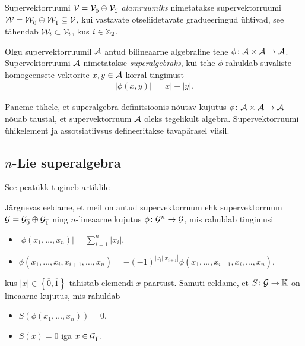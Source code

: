Supervektorruumi $\mathcal{V} = \mathcal{V}_{\overline{0}} \oplus \mathcal{V}_{\overline{1}}$
\emph{alamruumiks} nimetatakse supervektorruumi
$\mathcal{W} = \mathcal{W}_{\overline{0}} \oplus \mathcal{W}_{\overline{1}} \subseteq \mathcal{V}$, kui
vastavate otseliidetavate gradueeringud ühtivad, see tähendab
$\mathcal{W}_i \subset \mathcal{V}_i$, kus $i \in \mathbb{Z}_2$.

\begin{dfn}
    Olgu supervektorruumil $\mathcal{A}$ antud bilineaarne algebraline tehe
    $\phi \colon \mathcal{A} \times \mathcal{A} \to \mathcal{A}$. Supervektorruumi $\mathcal{A}$ nimetatakse
    \emph{superalgebraks}, kui tehe $\phi$ rahuldab suvaliste homogeensete
    vektorite $x, y \in \mathcal{A}$ korral tingimust
    \begin{align}\label{def:superalgebra-parity}
        \left|\phi(x, y)\right| = |x| + |y|.
    \end{align}
\end{dfn}

Paneme tähele, et superalgebra definitsioonis nõutav kujutus
$\phi \colon \mathcal{A} \times \mathcal{A} \to \mathcal{A}$ nõuab taustal, et supervektorruum
$\mathcal{A}$ oleks tegelikult algebra. Supervektorruumi ühikelement ja
assotsiatiivsus defineeritakse tavapärasel viisil.



\subsection{\texorpdfstring{$n$}\ -Lie superalgebra}

See peatükk tugineb artiklile \cite{Abramov:2014}

Järgnevas eeldame, et meil on antud supervektorruum
ehk supervektorruum $\mathcal{G} = \mathcal{G}_{\overline{0}} \oplus \mathcal{G}_{\overline{1}}$
ning $n$-lineaarne kujutus $\phi \colon \mathcal{G}^n \to \mathcal{G}$, mis rahuldab
tingimusi
\begin{itemize}
    \item $| \phi(x_1, \dots, x_n) | = \sum_{i=1}^n |x_i|$,
    \item $ \phi \left( x_1, \dots, x_i, x_{i+1}, \dots, x_n \right) =
            -(-1)^{ |x_i| |x_{i+1}| } \phi \left(
                x_1, \dots, x_{i+1}, x_i, \dots, x_n \right), $
\end{itemize}
kus $|x| \in \left\{ \overline{0}, \overline{1} \right\}$
tähistab elemendi $x$ paartust. Samuti eeldame, et $S \colon \mathcal{G} \to \mathbb{K}$
on lineaarne kujutus, mis rahuldab
\begin{itemize}
    \item $S \left( \phi \left( x_1, \dots, x_n \right) \right) = 0$,
    \item $S(x) = 0$ iga $x \in \mathcal{G}_{\overline{1}}$.
\end{itemize}


